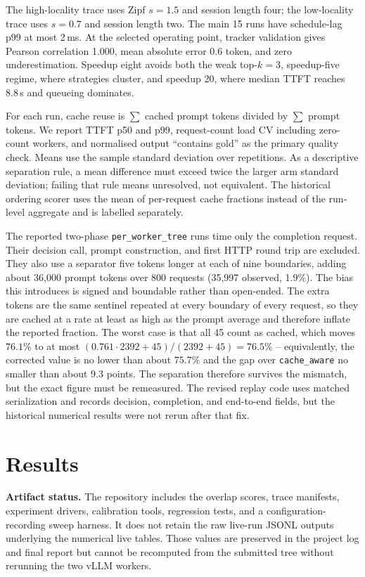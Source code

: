 \documentclass[conference]{IEEEtran}
\begin{document}
The high-locality trace uses Zipf $s{=}1.5$ and session length four;
the low-locality trace uses $s{=}0.7$ and session length two. The main
15 runs have schedule-lag p99 at most 2\,ms. At the selected operating
point, tracker validation gives Pearson correlation 1.000, mean
absolute error 0.6 token, and zero underestimation. Speedup eight avoids
both the weak top-$k{=}3$, speedup-five regime, where strategies cluster,
and speedup 20, where median TTFT reaches 8.8\,s and queueing dominates.

For each run, cache reuse is $\sum$ cached prompt tokens divided by
$\sum$ prompt tokens. We report TTFT p50 and p99, request-count load CV
including zero-count workers, and normalised output ``contains gold''
as the primary quality check. Means use the sample standard deviation
over repetitions. As a descriptive separation rule, a mean difference
must exceed twice the larger arm standard deviation; failing that rule
means unresolved, not equivalent. The historical ordering scorer uses
the mean of per-request cache fractions instead of the run-level
aggregate and is labelled separately.

The reported two-phase \texttt{per\_worker\_tree} runs time only the
completion request. Their decision call, prompt construction, and first
HTTP round trip are excluded. They also use a separator five tokens
longer at each of nine boundaries, adding about 36{,}000 prompt tokens
over 800 requests (35{,}997 observed, 1.9\%). The bias this introduces is
signed and boundable rather than open-ended. The extra tokens are the same
sentinel repeated at every boundary of every request, so they are cached at
a rate at least as high as the prompt average and therefore inflate the
reported fraction. The worst case is that all 45 count as cached, which
moves $76.1\%$ to at most $(0.761\cdot 2392+45)/(2392+45)=76.5\%$ --
equivalently, the corrected value is no lower than about $75.7\%$ and the
gap over \texttt{cache\_aware} no smaller than about 9.3 points. The
separation therefore survives the mismatch, but the exact figure must be
remeasured. The revised replay code uses matched serialization and records
decision, completion, and end-to-end fields, but the historical numerical
results were not rerun after that fix.

\section{Results}

\textbf{Artifact status.} The repository includes the overlap scores,
trace manifests, experiment drivers, calibration tools, regression
tests, and a configuration-recording sweep harness. It does not retain
the raw live-run JSONL outputs underlying the numerical live tables.
Those values are preserved in the project log and final report but
cannot be recomputed from the submitted tree without rerunning the two
vLLM workers.
\end{document}
